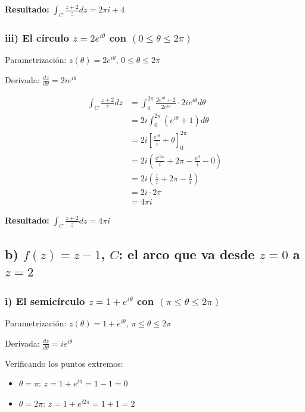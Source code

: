 \documentclass{article}
\begin{document}
\textbf{Resultado:} $\int_C \frac{z + 2}{z} dz = 2\pi i + 4$

\subsubsection*{iii) El círculo $z = 2e^{i\theta}$ con $(0 \leq \theta \leq 2\pi)$}

Parametrización: $z(\theta) = 2e^{i\theta}$, $0 \leq \theta \leq 2\pi$

Derivada: $\frac{dz}{d\theta} = 2ie^{i\theta}$

\begin{align*}
\int_C \frac{z + 2}{z} dz &= \int_0^{2\pi} \frac{2e^{i\theta} + 2}{2e^{i\theta}} \cdot 2ie^{i\theta} d\theta \\
                          &= 2i \int_0^{2\pi} (e^{i\theta} + 1) d\theta \\
                          &= 2i \left[\frac{e^{i\theta}}{i} + \theta\right]_0^{2\pi} \\
                          &= 2i \left(\frac{e^{i2\pi}}{i} + 2\pi - \frac{e^0}{i} - 0\right) \\
                          &= 2i \left(\frac{1}{i} + 2\pi - \frac{1}{i}\right) \\
                          &= 2i \cdot 2\pi \\
                          &= 4\pi i
\end{align*}

\textbf{Resultado:} $\int_C \frac{z + 2}{z} dz = 4\pi i$

\subsection*{b) $f(z) = z - 1$, $C$: el arco que va desde $z = 0$ a $z = 2$}

\subsubsection*{i) El semicírculo $z = 1 + e^{i\theta}$ con $(\pi \leq \theta \leq 2\pi)$}

Parametrización: $z(\theta) = 1 + e^{i\theta}$, $\pi \leq \theta \leq 2\pi$

Derivada: $\frac{dz}{d\theta} = ie^{i\theta}$

Verificando los puntos extremos:
\begin{itemize}
\item $\theta = \pi$: $z = 1 + e^{i\pi} = 1 - 1 = 0$ \checkmark
\item $\theta = 2\pi$: $z = 1 + e^{i2\pi} = 1 + 1 = 2$ \checkmark
\end{itemize}
\end{document}
